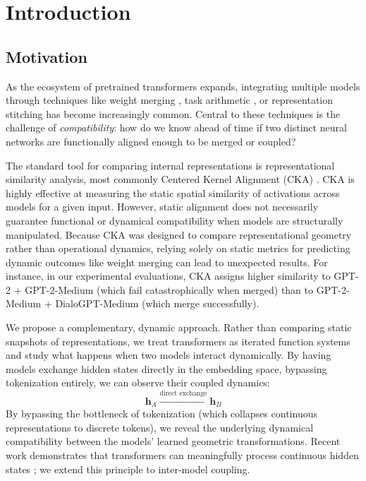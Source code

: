 \documentclass[10pt]{article} %
\theoremstyle{plain}
\theoremstyle{definition}
\theoremstyle{remark}
\newcommand{\vect}[1]{\bm{#1}}
\begin{document}
\section{Introduction}

\subsection{Motivation}

As the ecosystem of pretrained transformers expands, integrating multiple models through techniques like weight merging \citep{wortsman2022model}, task arithmetic \citep{ilharco2023task}, or representation stitching \citep{bansal2021stitching} has become increasingly common. Central to these techniques is the challenge of \textit{compatibility}: how do we know ahead of time if two distinct neural networks are functionally aligned enough to be merged or coupled?

The standard tool for comparing internal representations is representational similarity analysis, most commonly Centered Kernel Alignment (CKA) \citep{kornblith2019similarity}. CKA is highly effective at measuring the static spatial similarity of activations across models for a given input. However, static alignment does not necessarily guarantee functional or dynamical compatibility when models are structurally manipulated. Because CKA was designed to compare representational geometry rather than operational dynamics, relying solely on static metrics for predicting dynamic outcomes like weight merging can lead to unexpected results. For instance, in our experimental evaluations, CKA assigns higher similarity to GPT-2 + GPT-2-Medium (which fail catastrophically when merged) than to GPT-2-Medium + DialoGPT-Medium (which merge successfully).

We propose a complementary, dynamic approach. Rather than comparing static snapshots of representations, we treat transformers as iterated function systems \citep{haber2017stable,chen2018neuralode} and study what happens when two models interact dynamically. By having models exchange hidden states directly in the embedding space, bypassing tokenization entirely, we can observe their coupled dynamics:
\begin{equation}
    \vect{h}_A \xrightarrow{\text{direct exchange}} \vect{h}_B
\end{equation}
By bypassing the bottleneck of tokenization (which collapses continuous representations to discrete tokens), we reveal the underlying dynamical compatibility between the models' learned geometric transformations. Recent work demonstrates that transformers can meaningfully process continuous hidden states \citep{hao2024coconut,dehghani2019universal}; we extend this principle to inter-model coupling.
\end{document}
